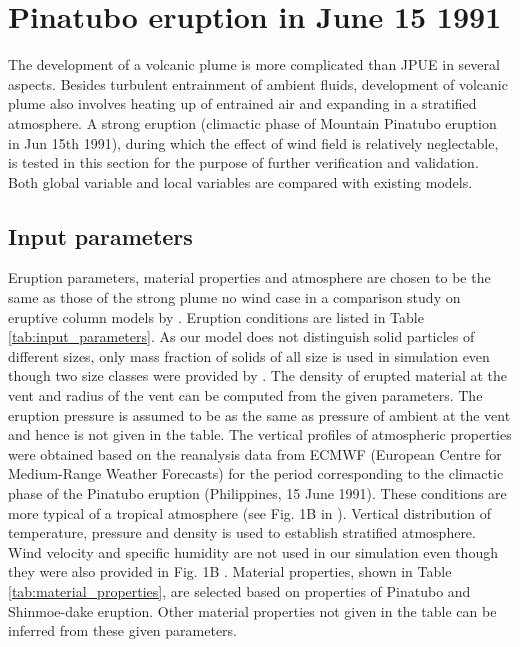 \section{Pinatubo eruption in June 15 1991}
The development of a volcanic plume is more complicated than JPUE in several aspects. Besides turbulent entrainment of ambient fluids, development of volcanic plume also involves heating up of entrained air and expanding in a stratified atmosphere. A strong eruption (climactic phase of Mountain Pinatubo eruption in Jun 15th 1991), during which the effect of wind field is relatively neglectable, is tested in this section for the purpose of further verification and validation.
Both global variable and local variables are compared with existing models.

\subsection{Input parameters}
\label{input-parameter}
Eruption parameters, material properties and atmosphere are chosen to be the same as those of the strong plume no wind case in a comparison study on eruptive column models by \citet {costa2016results}. Eruption conditions are listed in Table \ref{tab:input_parameters}. As our model does not distinguish solid particles of different sizes, only mass fraction of solids of all size is used in simulation even though two size classes were provided by \citet {costa2016results}. The density of erupted material at the vent and radius of the vent can be computed from the given parameters. The eruption pressure is assumed to be as the same as pressure of ambient at the vent and hence is not given in the table. The vertical profiles of atmospheric properties were obtained based on the reanalysis data from ECMWF (European Centre for Medium-Range Weather Forecasts) for the period corresponding to the climactic phase of the Pinatubo eruption (Philippines, 15 June 1991). These conditions are more typical of a tropical atmosphere (see Fig. 1B in \citep{costa2016results}).  
Vertical distribution of temperature, pressure and density is used to establish stratified atmosphere. Wind velocity and specific humidity are not used in our simulation even though they were also provided in Fig. 1B \citep{costa2016results}. Material properties, shown in Table \ref{tab:material_properties}, are selected based on properties of Pinatubo and Shinmoe-dake eruption. Other material properties not given in the table can be inferred from these given parameters.

